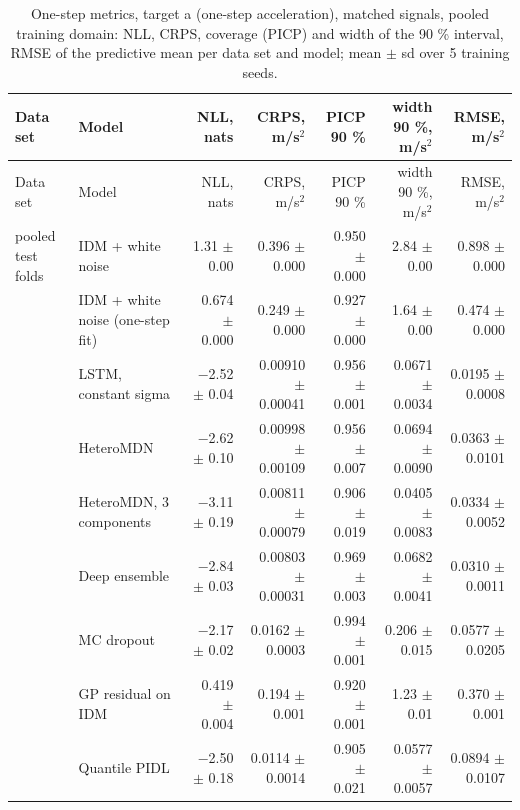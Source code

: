 \begingroup
\footnotesize
\begin{longtable}{llrrrrr}
\caption{One-step metrics, target a (one-step acceleration), matched signals, pooled training domain: NLL, CRPS, coverage (PICP) and width of the 90 \% interval, RMSE of the predictive mean per data set and model; mean $\pm$ sd over 5 training seeds.}\label{tab:t1-one-step--pool--a} \\
\toprule
Data set & Model & NLL, nats & CRPS, m/s$^2$ & PICP 90 \% & width 90 \%, m/s$^2$ & RMSE, m/s$^2$ \\
\midrule
\endfirsthead
\toprule
Data set & Model & NLL, nats & CRPS, m/s$^2$ & PICP 90 \% & width 90 \%, m/s$^2$ & RMSE, m/s$^2$ \\
\midrule
\endhead
\bottomrule
\endlastfoot
pooled test folds & IDM + white noise & 1.31 $\pm$ 0.00 & 0.396 $\pm$ 0.000 & 0.950 $\pm$ 0.000 & 2.84 $\pm$ 0.00 & 0.898 $\pm$ 0.000 \\
 & IDM + white noise (one-step fit) & 0.674 $\pm$ 0.000 & 0.249 $\pm$ 0.000 & 0.927 $\pm$ 0.000 & 1.64 $\pm$ 0.00 & 0.474 $\pm$ 0.000 \\
 & LSTM, constant sigma & $-$2.52 $\pm$ 0.04 & 0.00910 $\pm$ 0.00041 & 0.956 $\pm$ 0.001 & 0.0671 $\pm$ 0.0034 & 0.0195 $\pm$ 0.0008 \\
 & HeteroMDN & $-$2.62 $\pm$ 0.10 & 0.00998 $\pm$ 0.00109 & 0.956 $\pm$ 0.007 & 0.0694 $\pm$ 0.0090 & 0.0363 $\pm$ 0.0101 \\
 & HeteroMDN, 3 components & $-$3.11 $\pm$ 0.19 & 0.00811 $\pm$ 0.00079 & 0.906 $\pm$ 0.019 & 0.0405 $\pm$ 0.0083 & 0.0334 $\pm$ 0.0052 \\
 & Deep ensemble & $-$2.84 $\pm$ 0.03 & 0.00803 $\pm$ 0.00031 & 0.969 $\pm$ 0.003 & 0.0682 $\pm$ 0.0041 & 0.0310 $\pm$ 0.0011 \\
 & MC dropout & $-$2.17 $\pm$ 0.02 & 0.0162 $\pm$ 0.0003 & 0.994 $\pm$ 0.001 & 0.206 $\pm$ 0.015 & 0.0577 $\pm$ 0.0205 \\
 & GP residual on IDM & 0.419 $\pm$ 0.004 & 0.194 $\pm$ 0.001 & 0.920 $\pm$ 0.001 & 1.23 $\pm$ 0.01 & 0.370 $\pm$ 0.001 \\
 & Quantile PIDL & $-$2.50 $\pm$ 0.18 & 0.0114 $\pm$ 0.0014 & 0.905 $\pm$ 0.021 & 0.0577 $\pm$ 0.0057 & 0.0894 $\pm$ 0.0107 \\

\end{longtable}
